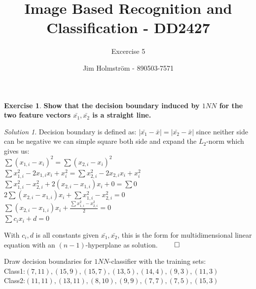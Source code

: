 \documentclass[a4paper,twoside=false,abstract=false,numbers=noenddot,
titlepage=false,headings=small,parskip=half,version=last]{scrartcl}
\author{Jim Holmström - 890503-7571}
\title{Image Based Recognition and Classification - DD2427}
\subtitle{Excercise 5}
\theoremstyle{definition}
\newtheorem{exercise}{Exercise}
\theoremstyle{remark}
\newtheorem*{solution}{Solution}
\begin{document}
\maketitle
\thispagestyle{empty}

\begin{exercise}
{\bf
    Show that the decision boundary induced by $1NN$ for the two feature vectors
    $\bar{x_1},\bar{x_2}$ is a straight line.
}
\end{exercise}
\begin{solution}
    Decision boundary is defined as: $|\bar{x_1}-\bar{x}|=|\bar{x_2}-\bar{x}|$
    since neither side can be negative we can simple square both side and expand
    the $L_2$-norm which gives us:\\

    $\sum{(x_{1,i}-x_i)^2}=\sum{(x_{2,i}-x_i)^2}$\\
    $\sum{x_{1,i}^2-2x_{1,i}x_i+x_i^2}=\sum{x_{2,i}^2-2x_{2,i}x_i+x_i^2}$\\
    $\sum{x_{1,i}^2-x_{2,i}^2+2(x_{2,i}-x_{1,i})x_i+0}=\sum{0}$\\
    $2\sum{(x_{2,i}-x_{1,i})x_i}+\sum{x_{1,i}^2-x_{2,i}^2}=0$\\
    $\sum{(x_{2,i}-x_{1,i})x_i}+\frac{\sum{x_{1,i}^2-x_{2,i}^2}}{2}=0$\\
    $\sum{c_ix_i}+d=0$

    With $c_i,d$ is all constants given $\bar{x_1},\bar{x_2}$, this is the form
    for multidimensional linear equation with an $(n-1)$-hyperplane as
    solution. $\qed$
\end{solution}
\begin{excercise}
Draw decision boundaries for $1NN$-classifier with the training sets:\\
Class1:${(7, 11), (15, 9), (15, 7), (13, 5), (14, 4), (9, 3), (11, 3)}$\\
Class2:${(11, 11), (13, 11), (8, 10), (9, 9), (7, 7), (7, 5), (15, 3)}$\\
\end{excercise}
\end{document}
